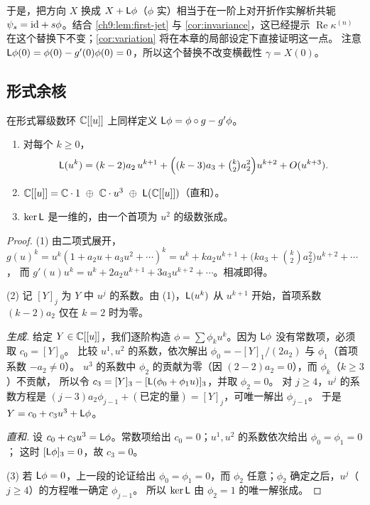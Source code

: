 于是，把方向 $X$ 换成 $X+\mathsf L\phi$（$\phi$ 实）相当于在一阶上对开折作实解析共轭 $\psi_s=\mathrm{id}+s\phi$。结合 \cref{ch9:lem:first-jet} 与 \cref{cor:invariance}，这已经提示 $\operatorname{Re}\kappa^{(n)}$ 在这个替换下不变；\cref{cor:variation} 将在本章的局部设定下直接证明这一点。
注意 $\mathsf L\phi(0)=\phi(0)-g'(0)\phi(0)=0$，所以这个替换不改变横截性 $\gamma=X(0)$。

\subsection{形式余核}
在形式幂级数环 $\mathbb{C}[[u]]$ 上同样定义 $\mathsf L\phi=\phi\circ g-g'\phi$。

\begin{proposition}\label{ch9:prop:formal-coker}
\begin{enumerate}
\item 对每个 $k\ge0$，
\[
 \mathsf L(u^k)=(k-2)a_2\,u^{k+1}+\Bigl((k-3)a_3+\tbinom k2a_2^2\Bigr)u^{k+2}+O(u^{k+3}) .
\]
\item $\C[[u]]=\C\cdot1\ \oplus\ \C\cdot u^3\ \oplus\ \Lop(\C[[u]])$（直和）。
\item $\ker\mathsf L$ 是一维的，由一个首项为 $u^2$ 的级数张成。
\end{enumerate}
\end{proposition}

\begin{proof}
(1) 由二项式展开，
$g(u)^k=u^k(1+a_2u+a_3u^2+\cdots)^k=u^k+ka_2u^{k+1}+\bigl(ka_3+\binom k2a_2^2\bigr)u^{k+2}+\cdots$，
而 $g'(u)u^k=u^k+2a_2u^{k+1}+3a_3u^{k+2}+\cdots$。相减即得。

(2) 记 $[Y]_j$ 为 $Y$ 中 $u^j$ 的系数。由 (1)，$\mathsf L(u^k)$ 从 $u^{k+1}$ 开始，首项系数 $(k-2)a_2$ 仅在 $k=2$ 时为零。

\emph{生成.} 给定 $Y\in\mathbb{C}[[u]]$，我们逐阶构造 $\phi=\sum\phi_ku^k$。因为 $\mathsf L\phi$ 没有常数项，必须取 $c_0=[Y]_0$。
比较 $u^1,u^2$ 的系数，依次解出 $\phi_0=-[Y]_1/(2a_2)$ 与 $\phi_1$（首项系数 $-a_2\ne0$）。
$u^3$ 的系数中 $\phi_2$ 的贡献为零（因 $(2-2)a_2=0$），而 $\phi_k$（$k\ge3$）不贡献，
所以令 $c_3=[Y]_3-[\mathsf L(\phi_0+\phi_1u)]_3$，并取 $\phi_2=0$。
对 $j\ge4$，$u^j$ 的系数方程是 $(j-3)a_2\phi_{j-1}+(\text{已定的量})=[Y]_j$，可唯一解出 $\phi_{j-1}$。
于是 $Y=c_0+c_3u^3+\mathsf L\phi$。

\emph{直和.} 设 $c_0+c_3u^3=\mathsf L\phi$。常数项给出 $c_0=0$；$u^1,u^2$ 的系数依次给出 $\phi_0=\phi_1=0$；
这时 $[\mathsf L\phi]_3=0$，故 $c_3=0$。

(3) 若 $\mathsf L\phi=0$，上一段的论证给出 $\phi_0=\phi_1=0$，而 $\phi_2$ 任意；$\phi_2$ 确定之后，$u^j$（$j\ge4$）的方程唯一确定 $\phi_{j-1}$。
所以 $\ker\mathsf L$ 由 $\phi_2=1$ 的唯一解张成。
\end{proof}

